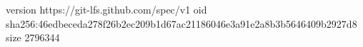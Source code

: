 version https://git-lfs.github.com/spec/v1
oid sha256:46edbeceda278f26b2ec209b1d67ac21186046e3a91e2a8b3b5646409b2927d8
size 2796344
